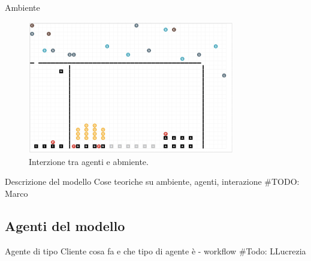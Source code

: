 \begin{frame}{Ambiente}
	\begin{figure}[H]
		\centering
		\includegraphics[width=9cm]{"../report/images/supermarket-execution.png"}
		\caption{Interzione tra agenti e abmiente.}
		\label{fig:supermarket_execution}
	\end{figure}	
\end{frame}




\begin{frame}{Descrizione del modello}
	\centering
	Cose teoriche su ambiente, agenti, interazione
	\#TODO: Marco
\end{frame}



\subsection{Agenti del modello}

\begin{frame}{Agente di tipo Cliente}
	\centering
	cosa fa e che tipo di agente è - workflow
	\#Todo: LLucrezia
\end{frame}




